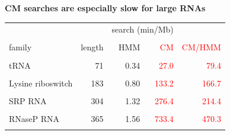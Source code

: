 \documentclass[landscape]{slides}
\begin{document}
\begin{slide}
\begin{center}
\textbf{CM searches are especially slow for large RNAs}
\medskip

\small
\begin{tabular}{lr|rr|r}
                  &        & \multicolumn{2}{c|}{search (min/Mb)} \\ %
                  &        &        & \\
family            & length & HMM    & \textcolor{red}{CM}     & \textcolor{red}{CM/HMM} \\ \hline 
                  &        &        &        & \\
tRNA              & 71     &  0.34  &  \textcolor{red}{27.0}  & \textcolor{red}{79.4}\\
                  &        &        &        & \\
Lysine riboswitch & 183    &  0.80  & \textcolor{red}{133.2}  & \textcolor{red}{166.7}\\
                  &        &        &        & \\
SRP RNA           & 304    &  1.32  & \textcolor{red}{276.4}  & \textcolor{red}{214.4}\\
                  &        &        &        & \\
RNaseP RNA        & 365    &  1.56  & \textcolor{red}{733.4}  & \textcolor{red}{470.3}\\
                  &        &        &      \\
\end{tabular}
\end{center}

\vfill

\end{slide}
\end{document}
